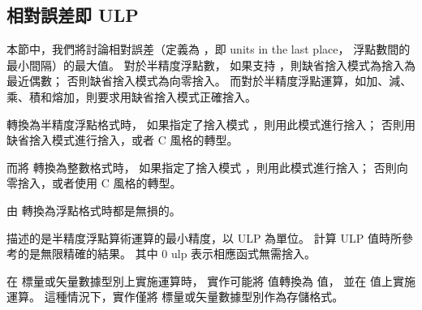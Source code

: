 \subsection[sec:relativeErrorHalf]{相對誤差即 ULP}

本節中，我們將討論相對誤差（定義為 ，即 units in the last place，
浮點數間的最小間隔）的最大值。
對於半精度浮點數，
如果支持 ，則缺省捨入模式為捨入為最近偶數；
否則缺省捨入模式為向零捨入。
而對於半精度浮點運算，如加、減、乘、積和熔加，則要求用缺省捨入模式正確捨入。

轉換為半精度浮點格式時，
如果指定了捨入模式 ，則用此模式進行捨入；
否則用缺省捨入模式進行捨入，或者 C 風格的轉型。

而將  轉換為整數格式時，
如果指定了捨入模式 ，則用此模式進行捨入；
否則向零捨入，或者使用 C 風格的轉型。

由  轉換為浮點格式時都是無損的。

描述的是半精度浮點算術運算的最小精度，以 ULP 為單位。
計算 ULP 值時所參考的是無限精確的結果。
其中 0 ulp 表示相應函式無需捨入。

{}

\startnotepar
在  標量或矢量數據型別上實施運算時，
實作可能將  值轉換為  值，
並在  值上實施運算。
這種情況下，實作僅將  標量或矢量數據型別作為存儲格式。
\stopnotepar

